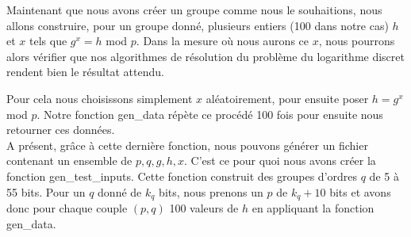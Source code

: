		    Maintenant que nous avons créer un groupe comme nous le souhaitions, nous allons construire, pour un groupe donné, plusieurs entiers (100 dans notre cas) $h$ et $x$ tels que $g^x = h$ mod $p$. Dans la mesure où nous aurons ce $x$, nous pourrons alors vérifier que nos algorithmes de résolution du problème du logarithme discret rendent bien le résultat attendu.

		    Pour cela nous choisissons simplement $x$ aléatoirement, pour ensuite poser $h = g^x$ mod $p$. Notre fonction gen\_data répète ce procédé 100 fois pour ensuite nous retourner ces données.\\

		    A présent, grâce à cette dernière fonction, nous pouvons générer un fichier contenant un ensemble de $p, q, g, h, x$. C'est ce pour quoi nous avons créer la fonction gen\_test\_inputs. Cette fonction construit des groupes d'ordres $q$ de 5 à 55 bits. Pour un $q$ donné de $k_q$ bits, nous prenons un $p$ de $k_q + 10$ bits et avons donc pour chaque couple $(p,q)$ 100 valeurs de $h$ en appliquant la fonction gen\_data.
